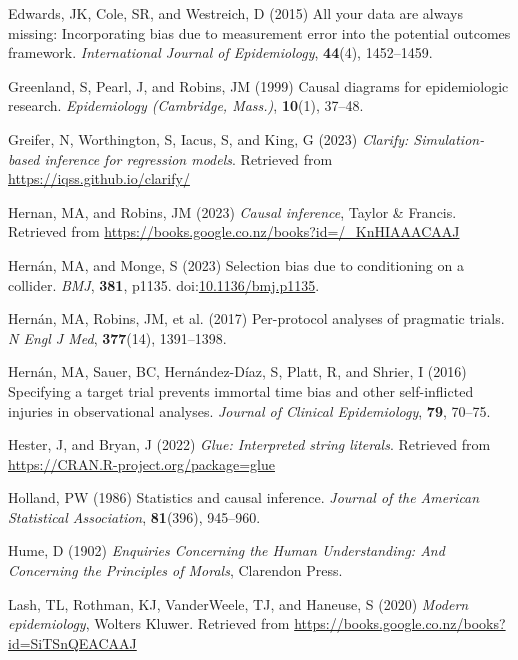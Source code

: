 \documentclass[
  singlecolumn]{article}
\newlength{\cslhangindent}
\newenvironment{CSLReferences}[2] %
 {\begin{list}{}{%
  \setlength{\itemindent}{0pt}
  \setlength{\leftmargin}{0pt}
  \setlength{\parsep}{0pt}
  \ifodd #1
   \setlength{\leftmargin}{\cslhangindent}
   \setlength{\itemindent}{-1\cslhangindent}
  \fi
  \setlength{\itemsep}{#2\baselineskip}}}
 {\end{list}}
\begin{document}
\begin{CSLReferences}{1}{0}
Edwards, JK, Cole, SR, and Westreich, D (2015) All your data are always
missing: Incorporating bias due to measurement error into the potential
outcomes framework. \emph{International Journal of Epidemiology},
\textbf{44}(4), 1452--1459.

Greenland, S, Pearl, J, and Robins, JM (1999) Causal diagrams for
epidemiologic research. \emph{Epidemiology (Cambridge, Mass.)},
\textbf{10}(1), 37--48.

Greifer, N, Worthington, S, Iacus, S, and King, G (2023) \emph{Clarify:
Simulation-based inference for regression models}. Retrieved from
\url{https://iqss.github.io/clarify/}

Hernan, MA, and Robins, JM (2023) \emph{Causal inference}, Taylor \&
Francis. Retrieved from
\url{https://books.google.co.nz/books?id=/_KnHIAAACAAJ}

Hernán, MA, and Monge, S (2023) Selection bias due to conditioning on a
collider. \emph{BMJ}, \textbf{381}, p1135.
doi:\href{https://doi.org/10.1136/bmj.p1135}{10.1136/bmj.p1135}.

Hernán, MA, Robins, JM, et al. (2017) Per-protocol analyses of pragmatic
trials. \emph{N Engl J Med}, \textbf{377}(14), 1391--1398.

Hernán, MA, Sauer, BC, Hernández-Díaz, S, Platt, R, and Shrier, I (2016)
Specifying a target trial prevents immortal time bias and other
self-inflicted injuries in observational analyses. \emph{Journal of
Clinical Epidemiology}, \textbf{79}, 70--75.

Hester, J, and Bryan, J (2022) \emph{Glue: Interpreted string literals}.
Retrieved from \url{https://CRAN.R-project.org/package=glue}

Holland, PW (1986) Statistics and causal inference. \emph{Journal of the
American Statistical Association}, \textbf{81}(396), 945--960.

Hume, D (1902) \emph{Enquiries Concerning the Human Understanding: And
Concerning the Principles of Morals}, Clarendon Press.

Lash, TL, Rothman, KJ, VanderWeele, TJ, and Haneuse, S (2020)
\emph{Modern epidemiology}, Wolters Kluwer. Retrieved from
\url{https://books.google.co.nz/books?id=SiTSnQEACAAJ}


\end{CSLReferences}
\end{document}
